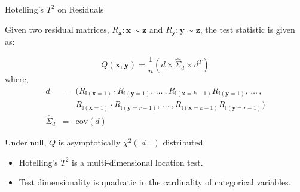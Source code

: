 \documentclass{beamer}
\begin{document}
\begin{frame}{Hotelling's $ T^2 $ on Residuals}

Given two residual matrices, $ R_{\mathbf{x}}: \mathbf{x} \sim \mathbf{z} $ and $ R_{\mathbf{y}}: \mathbf{y} \sim \mathbf{z} $, the test statistic is given as:

\begin{equation}
	Q(\mathbf{x}, \mathbf{y}) = \frac{1}{n} \left( d \times \hat{\Sigma}_d \times d^T \right)
\end{equation}
where,
\begin{eqnarray*}
d &  =  & (R_{\mathbb{I}(\mathbf{x}=1)} \cdot R_{\mathbb{I}(\mathbf{y}=1)}, \, \ldots \ ,
R_{\mathbb{I}(\mathbf{x}=k-1)} R_{\mathbb{I}(\mathbf{y}=1)}, \, \ldots \, ,
\\
 &  & R_{\mathbb{I}(\mathbf{x}=1)} \cdot R_{\mathbb{I}(\mathbf{y}=r-1)}, \, \ldots \ ,
R_{\mathbb{I}(\mathbf{x}=k-1)} R_{\mathbb{I}(\mathbf{y}=r-1)}
) \\
\hat{\Sigma}_d & = &\textrm{cov}(d)
\end{eqnarray*}



Under null, $ Q $ is asymptotically $ \chi^2 (\mid d \mid) $ distributed.

\vspace{1em}

\begin{itemize}
	\item Hotelling's $ T^2 $ is a multi-dimensional location test.
	\item Test dimensionality is quadratic in the cardinality of categorical variables.
\end{itemize}

\end{frame}
\end{document}
